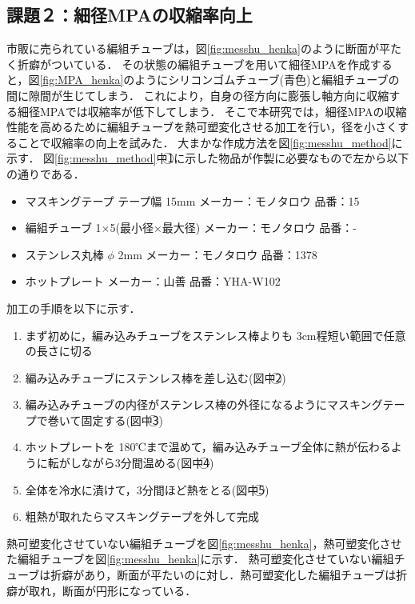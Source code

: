 \subsection{課題２：細径MPAの収縮率向上}
市販に売られている編組チューブは，図\ref{fig:messhu_henka}のように断面が平たく折癖がついている．
その状態の編組チューブを用いて細径MPAを作成すると，図\ref{fig:MPA_henka}のようにシリコンゴムチューブ(青色)と編組チューブの間に隙間が生じてしまう．
これにより，自身の径方向に膨張し軸方向に収縮する細径MPAでは収縮率が低下してしまう．
そこで本研究では，細径MPAの収縮性能を高めるために編組チューブを熱可塑変化させる加工を行い，径を小さくすることで収縮率の向上を試みた．
大まかな作成方法を図\ref{fig:messhu_method}に示す．
図\ref{fig:messhu_method}中\textcircled{\scriptsize 1}に示した物品が作製に必要なもので左から以下の通りである．
%
\begin{itemize}
  \item マスキングテープ テープ幅 15mm メーカー：モノタロウ 品番：15
  \item 編組チューブ 1×5(最小径×最大径) メーカー：モノタロウ 品番：-
  \item ステンレス丸棒 $\phi$ 2mm メーカー：モノタロウ 品番：1378
  \item ホットプレート メーカー：山善 品番：YHA-W102
\end{itemize}
%
加工の手順を以下に示す．
\vspace{3mm}
\begin{enumerate}
  \item まず初めに，編み込みチューブをステンレス棒よりも 3cm程短い範囲で任意の長さに切る
  \item 編み込みチューブにステンレス棒を差し込む(図中\textcircled{\scriptsize 2})
  \item 編み込みチューブの内径がステンレス棒の外径になるようにマスキングテープで巻いて固定する(図中\textcircled{\scriptsize 3})
  \item ホットプレートを 180℃まで温めて，編み込みチューブ全体に熱が伝わるように転がしながら3分間温める(図中\textcircled{\scriptsize 4})
  \item 全体を冷水に漬けて，3分間ほど熱をとる(図中\textcircled{\scriptsize 5})
  \item 粗熱が取れたらマスキングテープを外して完成
\end{enumerate}
熱可塑変化させていない編組チューブを図\ref{fig:messhu_henka}，熱可塑変化させた編組チューブを図\ref{fig:messhu_henka}に示す．
熱可塑変化させていない編組チューブは折癖があり，断面が平たいのに対し．熱可塑変化した編組チューブは折癖が取れ，断面が円形になっている．
